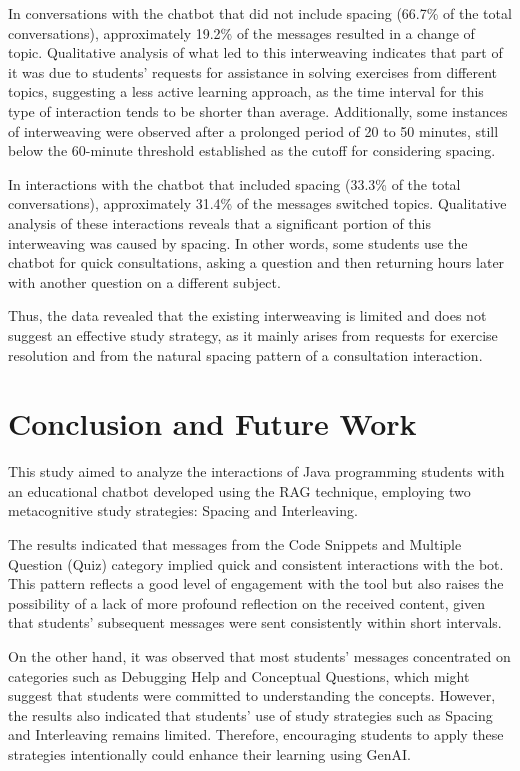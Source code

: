 \documentclass[a4paper,twoside]{article}
\begin{document}
In conversations with the chatbot that did not include spacing (66.7\% of the total
conversations), approximately 19.2\% of the messages resulted in a change of
topic. Qualitative analysis of what led to this interweaving indicates that
part of it was due to students' requests for assistance in solving exercises
from different topics, suggesting a less active learning approach, as the time
interval for this type of interaction tends to be shorter than average.
Additionally, some instances of interweaving were observed after a prolonged
period of 20 to 50 minutes, still below the 60-minute threshold established as
the cutoff for considering spacing.

In interactions with the chatbot that included spacing (33.3\% of the total
conversations), approximately 31.4\% of the messages switched topics.
Qualitative analysis of these interactions reveals that a significant portion
of this interweaving was caused by spacing. In other words, some students use
the chatbot for quick consultations, asking a question and then returning hours
later with another question on a different subject.

Thus, the data revealed that the existing interweaving is limited and does not
suggest an effective study strategy, as it mainly arises from requests for
exercise resolution and from the natural spacing pattern of a consultation
interaction.

\section{Conclusion and Future Work}

This study aimed to analyze the interactions of Java programming students with
an educational chatbot developed using the RAG technique, employing two
metacognitive study strategies: Spacing and Interleaving.

The results indicated that messages from the Code Snippets and Multiple Question
(Quiz) category implied quick and consistent interactions with the bot. This
pattern reflects a good level of engagement with the tool but also raises the
possibility of a lack of more profound reflection on the received content, given
that students' subsequent messages were sent consistently within short intervals.

On the other hand, it was observed that most students' messages concentrated on
categories such as Debugging Help and Conceptual Questions, which might suggest
that students were committed to understanding the concepts. However, the results
also indicated that students' use of study strategies such as Spacing and
Interleaving remains limited. Therefore, encouraging students to apply these
strategies intentionally could enhance their learning using GenAI.
\end{document}
